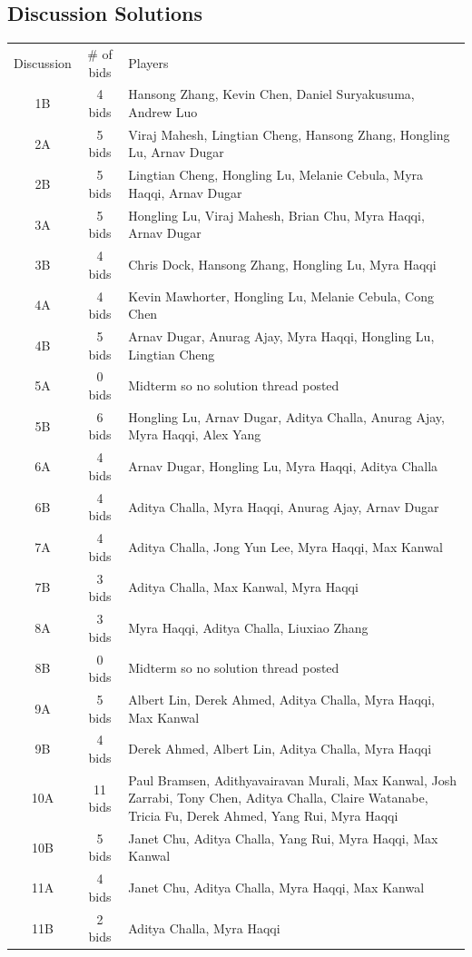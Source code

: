 \documentclass[leqno]{article}
\begin{document}
\subsection{Discussion Solutions}
\begin{tabular}{c c l}
Discussion & \# of bids & Players\\
1B & 4 bids & Hansong Zhang, Kevin Chen, Daniel Suryakusuma, Andrew Luo\\
2A & 5 bids & Viraj Mahesh, Lingtian Cheng, Hansong Zhang, Hongling Lu, Arnav Dugar\\
2B & 5 bids & Lingtian Cheng, Hongling Lu, Melanie Cebula, Myra Haqqi, Arnav Dugar\\
3A & 5 bids & Hongling Lu, Viraj Mahesh, Brian Chu, Myra Haqqi, Arnav Dugar\\
3B & 4 bids & Chris Dock, Hansong Zhang, Hongling Lu, Myra Haqqi\\
4A & 4 bids & Kevin Mawhorter, Hongling Lu, Melanie Cebula, Cong Chen\\
4B & 5 bids & Arnav Dugar, Anurag Ajay, Myra Haqqi, Hongling Lu, Lingtian Cheng\\
5A & 0 bids & Midterm so no solution thread posted\\
5B & 6 bids & Hongling Lu, Arnav Dugar, Aditya Challa, Anurag Ajay, Myra Haqqi, Alex Yang\\
6A & 4 bids & Arnav Dugar, Hongling Lu, Myra Haqqi, Aditya Challa\\
6B & 4 bids & Aditya Challa, Myra Haqqi, Anurag Ajay, Arnav Dugar\\
7A & 4 bids & Aditya Challa, Jong Yun Lee, Myra Haqqi, Max Kanwal\\
7B & 3 bids & Aditya Challa, Max Kanwal, Myra Haqqi\\
8A & 3 bids & Myra Haqqi, Aditya Challa, Liuxiao Zhang\\
8B & 0 bids & Midterm so no solution thread posted\\
9A & 5 bids & Albert Lin, Derek Ahmed, Aditya Challa, Myra Haqqi, Max Kanwal\\
9B & 4 bids & Derek Ahmed, Albert Lin, Aditya Challa, Myra Haqqi\\
10A & 11 bids & Paul Bramsen, Adithyavairavan Murali, Max Kanwal, Josh Zarrabi, Tony Chen, Aditya Challa, Claire Watanabe, Tricia Fu, Derek Ahmed, Yang Rui, Myra Haqqi\\
10B & 5 bids & Janet Chu, Aditya Challa, Yang Rui, Myra Haqqi, Max Kanwal\\
11A & 4 bids & Janet Chu, Aditya Challa, Myra Haqqi, Max Kanwal\\
11B & 2 bids & Aditya Challa, Myra Haqqi
\end{tabular}\\
\end{document}
